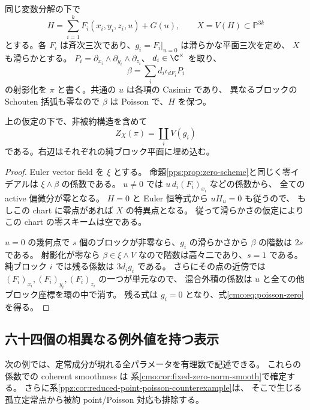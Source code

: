 同じ変数分解の下で
\[
 H=\sum_{i=1}^kF_i(x_i,y_i,z_i,u)+G(u),\qquad
 X=V(H)\subset\mathbb P^{3k}
\]
とする。各 $F_i$ は斉次三次であり、$g_i=F_i|_{u=0}$ は滑らかな平面三次を定め、
$X$ も滑らかとする。
$P_i=\partial_{x_i}\wedge\partial_{y_i}\wedge\partial_{z_i}$、
$d_i\in\C^\times$ を取り、
\[
 \beta=\sum_i d_i\iota_{dF_i}P_i
\]
の射影化を $\pi$ と書く。共通の $u$ は各項の Casimir であり、
異なるブロックの Schouten 括弧も零なので $\beta$ は Poisson で、$H$ を保つ。

\begin{proposition}
\label{cmo:prop:poisson-zero}
上の仮定の下で、非被約構造を含めて
\begin{equation}\label{cmo:eq:poisson-zero}
 Z_X(\pi)=\coprod_iV(g_i)
\end{equation}
である。右辺はそれぞれの純ブロック平面に埋め込む。
\end{proposition}
\begin{proof}
Euler vector field を $\xi$ とする。
命題\ref{pps:prop:zero-scheme}と同じく零イデアルは $\xi\wedge\beta$ の係数である。
$u\ne0$ では $u\,d_i(F_i)_{x_i}$ などの係数から、
全ての active 偏微分が零となる。
$H=0$ と Euler 恒等式から $uH_u=0$ も従うので、
もしこの chart に零点があれば $X$ の特異点となる。
従って滑らかさの仮定によりこの chart の零スキームは空である。

$u=0$ の幾何点で $s$ 個のブロックが非零なら、$g_i$ の滑らかさから
$\beta$ の階数は $2s$ である。
射影化が零なら $\beta\in\xi\wedge V$ なので階数は高々二であり、$s=1$ である。
純ブロック $i$ では残る係数は $3d_i g_i$ である。
さらにその点の近傍では $(F_i)_{x_i},(F_i)_{y_i},(F_i)_{z_i}$ の一つが単元なので、
混合外積の係数は $u$ と全ての他ブロック座標を環の中で消す。
残る式は $g_i=0$ となり、式\eqref{cmo:eq:poisson-zero}を得る。
\end{proof}

\subsection{六十四個の相異なる例外値を持つ表示}

次の例では、定常成分が現れる全パラメータを有理数で記述できる。
これらの係数での coherent smoothness は
系\ref{cmo:cor:fixed-zero-norm-smooth}で確定する。
さらに系\ref{ppz:cor:reduced-point-poisson-counterexample}は、
そこで生じる孤立定常点から被約 point/Poisson 対応も排除する。

